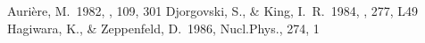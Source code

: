 \documentclass[11pt,twoside]{article}  %
\begin{document}
%
%
%

\begin{references}

 Auri\`ere, M.\  1982, \aap, 109, 301
 Djorgovski, S., \& King, I.\ R.\  1984, \apj, 277, L49
 Hagiwara, K., \& Zeppenfeld, D.\  1986, Nucl.Phys., 274, 1
    
\end{references}

\end{document}
